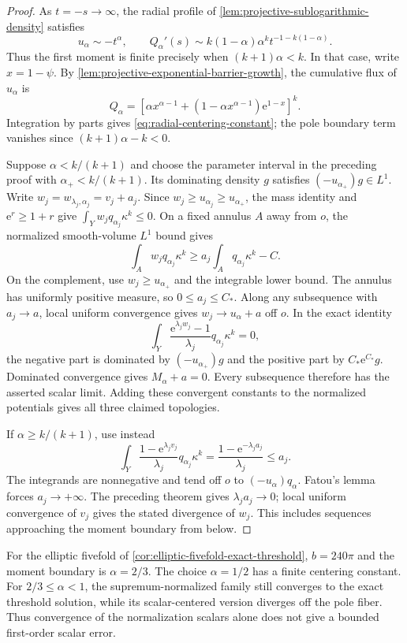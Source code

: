 \begin{proof}
As $t=-s\to\infty$, the radial profile of \cref{lem:projective-sublogarithmic-density} satisfies
\[
 u_\alpha\sim-t^\alpha,\qquad
 Q_\alpha'(s)\sim k(1-\alpha)\alpha^k
                         t^{-1-k(1-\alpha)}.
\]
Thus the first moment is finite precisely when $(k+1)\alpha<k$. In that case, write $x=1-\psi$. By \cref{lem:projective-exponential-barrier-growth}, the cumulative flux of $u_\alpha$ is
\[
 Q_\alpha=\left[\alpha x^{\alpha-1}
                  +(1-\alpha x^{\alpha-1})\mathrm e^{1-x}\right]^k.
\]
Integration by parts gives \eqref{eq:radial-centering-constant}; the pole boundary term vanishes since $(k+1)\alpha-k<0$.

Suppose $\alpha<k/(k+1)$ and choose the parameter interval in the preceding proof with $\alpha_+<k/(k+1)$. Its dominating density $g$ satisfies $(-u_{\alpha_+})g\in L^1$. Write $w_j=w_{\lambda_j,\alpha_j}=v_j+a_j$. Since $w_j\geq u_{\alpha_j}\geq u_{\alpha_+}$, the mass identity and $\mathrm e^r\geq1+r$ give $\int_Yw_jq_{\alpha_j}\kappa^k\leq0$. On a fixed annulus $A$ away from $o$, the normalized smooth-volume $L^1$ bound gives
\[
 \int_Aw_jq_{\alpha_j}\kappa^k
       \geq a_j\int_Aq_{\alpha_j}\kappa^k-C.
\]
On the complement, use $w_j\geq u_{\alpha_+}$ and the integrable lower bound. The annulus has uniformly positive measure, so $0\leq a_j\leq C_*$. Along any subsequence with $a_j\to a$, local uniform convergence gives $w_j\to u_\alpha+a$ off $o$. In the exact identity
\[
 \int_Y\frac{\mathrm e^{\lambda_jw_j}-1}{\lambda_j}
                            q_{\alpha_j}\kappa^k=0,
\]
the negative part is dominated by $(-u_{\alpha_+})g$ and the positive part by $C_*\mathrm e^{C_*}g$. Dominated convergence gives $M_\alpha+a=0$. Every subsequence therefore has the asserted scalar limit. Adding these convergent constants to the normalized potentials gives all three claimed topologies.

If $\alpha\geq k/(k+1)$, use instead
\[
 \int_Y\frac{1-\mathrm e^{\lambda_jv_j}}{\lambda_j}
                          q_{\alpha_j}\kappa^k
   =\frac{1-\mathrm e^{-\lambda_ja_j}}{\lambda_j}\leq a_j.
\]
The integrands are nonnegative and tend off $o$ to $(-u_\alpha)q_\alpha$. Fatou's lemma forces $a_j\to+\infty$. The preceding theorem gives $\lambda_ja_j\to0$; local uniform convergence of $v_j$ gives the stated divergence of $w_j$. This includes sequences approaching the moment boundary from below.
\end{proof}

For the elliptic fivefold of \cref{cor:elliptic-fivefold-exact-threshold}, $b=240\pi$ and the moment boundary is $\alpha=2/3$. The choice $\alpha=1/2$ has a finite centering constant. For $2/3\leq\alpha<1$, the supremum-normalized family still converges to the exact threshold solution, while its scalar-centered version diverges off the pole fiber. Thus convergence of the normalization scalars alone does not give a bounded first-order scalar error.


